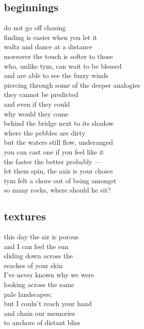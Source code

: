 \documentclass{article}
\begin{document}
\subsection{beginnings}

do not go off chasing\\
finding is easier when you let it\\
waltz and dance at a distance\\
moreover the touch is softer to those\\
who, unlike tym, can wait to be blessed\\
and are able to see the fuzzy winds \\
piercing through some of the deeper analogies\\

they cannot be predicted\\
and even if they could\\
why would they come\\
behind the bridge next to its shadow\\
where the pebbles are dirty\\
but the waters still flow, underanged\\

you can cast one if you feel like it\\
the faster the better probably ---\\
let them spin, the axis is your choice\\
tym felt a chore out of being amongst\\
so many rocks, where should he sit?

\clearpage

\subsection{textures}



this day the air is porous\\
and I can feel the sun\\
sliding down across the\\
reaches of your skin\\
I've never known why we were\\
looking across the same\\
pale landscapes; \\
but I couln't reach your hand\\
and chain our memories\\
to anchors of distant bliss\\
\end{document}
